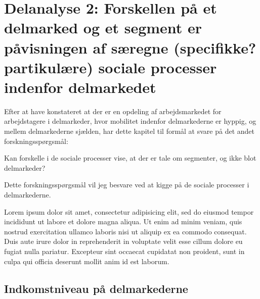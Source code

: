 

\chapter{Delanalyse 2: Forskellen på et delmarked og et segment er påvisningen af særegne (specifikke? partikulære) sociale processer indenfor delmarkedet \label{kapitel_delanalyse2_socialeprocesser}}

Efter at have konstateret at der er en opdeling af arbejdsmarkedet for arbejdstagere i delmarkeder, hvor mobilitet indenfor delmarkederne er hyppig, og mellem delmarkederne sjælden, har dette kapitel til formål at svare på det andet forskningsspørgsmål:

\begin{tcolorbox}[title=Forskningspørgsmål,
subtitle style={boxrule=0.4pt} ]
   Kan forskelle i de sociale processer vise, at der er tale om segmenter, og ikke blot delmarkeder?
\end{tcolorbox}

Dette forskningsspørgsmål vil jeg besvare ved at kigge på de sociale processer i delmarkederne.

Lorem ipsum dolor sit amet, consectetur adipisicing elit, sed do eiusmod
tempor incididunt ut labore et dolore magna aliqua. Ut enim ad minim veniam,
quis nostrud exercitation ullamco laboris nisi ut aliquip ex ea commodo
consequat. Duis aute irure dolor in reprehenderit in voluptate velit esse
cillum dolore eu fugiat nulla pariatur. Excepteur sint occaecat cupidatat non
proident, sunt in culpa qui officia deserunt mollit anim id est laborum.



\section{Indkomstniveau på delmarkederne \label{sec_delanalyse2_loen}}



